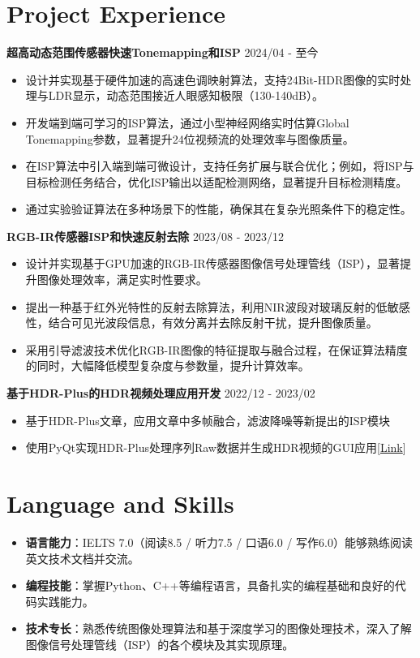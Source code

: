 \documentclass[a4paper]{article}
\begin{document}
\section*{Project Experience}
\textbf{超高动态范围传感器快速Tonemapping和ISP} \hfill 2024/04 - 至今
\begin{itemize}[noitemsep]
\item 设计并实现基于硬件加速的高速色调映射算法，支持24Bit-HDR图像的实时处理与LDR显示，动态范围接近人眼感知极限（130-140dB）。
\item 开发端到端可学习的ISP算法，通过小型神经网络实时估算Global Tonemapping参数，显著提升24位视频流的处理效率与图像质量。
\item 在ISP算法中引入端到端可微设计，支持任务扩展与联合优化；例如，将ISP与目标检测任务结合，优化ISP输出以适配检测网络，显著提升目标检测精度。
\item 通过实验验证算法在多种场景下的性能，确保其在复杂光照条件下的稳定性。
\end{itemize}

\textbf{RGB-IR传感器ISP和快速反射去除} \hfill 2023/08 - 2023/12
\begin{itemize}[noitemsep]
\item 设计并实现基于GPU加速的RGB-IR传感器图像信号处理管线（ISP），显著提升图像处理效率，满足实时性要求。
\item 提出一种基于红外光特性的反射去除算法，利用NIR波段对玻璃反射的低敏感性，结合可见光波段信息，有效分离并去除反射干扰，提升图像质量。
\item 采用引导滤波技术优化RGB-IR图像的特征提取与融合过程，在保证算法精度的同时，大幅降低模型复杂度与参数量，提升计算效率。
\end{itemize}

\textbf{基于HDR-Plus的HDR视频处理应用开发} \hfill 2022/12 - 2023/02
\begin{itemize}[noitemsep]
  \item 基于HDR-Plus文章，应用文章中多帧融合，滤波降噪等新提出的ISP模块
  \item 使用PyQt实现HDR-Plus处理序列Raw数据并生成HDR视频的GUI应用[\href{https://github.com/Zhang-Setsail/Computer_Graphics/tree/main/code/Project}{Link}]
\end{itemize}

\section*{Language and Skills}
\begin{itemize}[noitemsep]
\item \textbf{语言能力}：IELTS 7.0（阅读8.5 / 听力7.5 / 口语6.0 / 写作6.0）能够熟练阅读英文技术文档并交流。
\item \textbf{编程技能}：掌握Python、C++等编程语言，具备扎实的编程基础和良好的代码实践能力。
\item \textbf{技术专长}：熟悉传统图像处理算法和基于深度学习的图像处理技术，深入了解图像信号处理管线（ISP）的各个模块及其实现原理。
\end{itemize}
\end{document}
